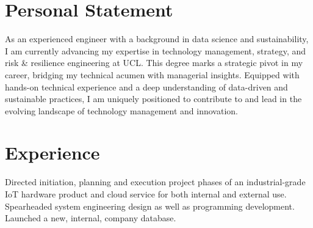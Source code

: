 \documentclass[]{plushcv}
\begin{document}
\thispagestyle{empty}

\begin{minipage}[t]{0.70\textwidth} 

\section{Personal Statement}
{\justifying As an experienced engineer with a background in data science and sustainability, I am currently advancing my expertise in technology management, strategy, and risk \& resilience engineering at UCL. This degree marks a strategic pivot in my career, bridging my technical acumen with managerial insights. Equipped with hands-on technical experience and a deep understanding of data-driven and sustainable practices, I am uniquely positioned to contribute to and lead in the evolving landscape of technology management and innovation.}


\section{Experience}
	\vspace{\topsep} %
	\begin{tightemize}
		\item Directed initiation, planning and execution project phases of an industrial-grade IoT hardware product and cloud service for both internal and external use. Spearheaded system engineering design as well as programming development. Launched a new, internal, company database.

\end{tightemize}
\end{minipage}
\end{document}
